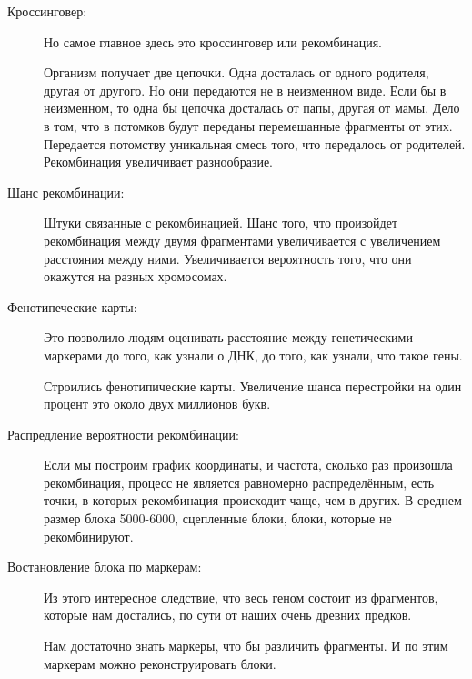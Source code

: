 \begin{description}
\item[Кроссинговер:]
Но самое главное здесь это кроссинговер или рекомбинация. 

Организм получает две цепочки. Одна досталась от одного родителя,
другая от другого. Но они передаются не в неизменном виде. Если бы 
в неизменном, то одна бы цепочка досталась от папы, другая от мамы. 
Дело в том, что в потомков будут переданы перемешанные фрагменты от 
этих. Передается потомству уникальная смесь того, что передалось от родителей. 
Рекомбинация увеличивает разнообразие. 
\item[Шанс рекомбинации:]
Штуки связанные с рекомбинацией. Шанс того, что произойдет 
рекомбинация между двумя фрагментами увеличивается с увеличением расстояния между ними. 
Увеличивается вероятность того, что они окажутся на разных хромосомах. 

\item[Фенотипеческие карты:]
Это позволило людям оценивать расстояние между генетическими маркерами до того, 
как узнали о ДНК, до того, как узнали, что такое гены.

Строились фенотипические карты. Увеличение шанса перестройки на один процент это около двух миллионов букв. 

\item[Распредление вероятности рекомбинации:]
Если мы построим график координаты, и частота, сколько раз произошла рекомбинация, 
процесс не является равномерно распределённым, есть точки, в которых рекомбинация происходит 
чаще, чем в других. В среднем размер блока 5000-6000, сцепленные блоки, блоки, которые не рекомбинируют. 

\item[Востановление блока по маркерам:]
Из этого интересное следствие, что весь геном состоит из фрагментов, 
которые нам достались, по сути от наших очень древних предков. 

Нам достаточно знать маркеры, что бы различить фрагменты. И по этим маркерам 
можно реконструировать блоки. 
  
\end{description}